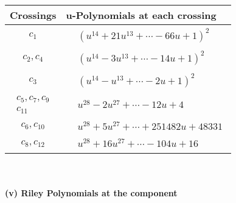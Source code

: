 \documentclass[1p]{elsarticle_modified}
\theoremstyle{definition}
\begin{document}
\begin{tabular}{m{50pt}|m{274pt}}
Crossings & \hspace{64pt}u-Polynomials at each crossing \\
\hline $$\begin{aligned}c_{1}\end{aligned}$$&$\begin{aligned}
&(u^{14}+21 u^{13}+\cdots-66 u+1)^{2}
\end{aligned}$\\
\hline $$\begin{aligned}c_{2},c_{4}\end{aligned}$$&$\begin{aligned}
&(u^{14}-3 u^{13}+\cdots-14 u+1)^{2}
\end{aligned}$\\
\hline $$\begin{aligned}c_{3}\end{aligned}$$&$\begin{aligned}
&(u^{14}- u^{13}+\cdots-2 u+1)^{2}
\end{aligned}$\\
\hline $$\begin{aligned}c_{5},c_{7},c_{9}\\c_{11}\end{aligned}$$&$\begin{aligned}
&u^{28}-2 u^{27}+\cdots-12 u+4
\end{aligned}$\\
\hline $$\begin{aligned}c_{6},c_{10}\end{aligned}$$&$\begin{aligned}
&u^{28}+5 u^{27}+\cdots+251482 u+48331
\end{aligned}$\\
\hline $$\begin{aligned}c_{8},c_{12}\end{aligned}$$&$\begin{aligned}
&u^{28}+16 u^{27}+\cdots-104 u+16
\end{aligned}$\\
\hline
\end{tabular}\\~\\
\newpage\renewcommand{\arraystretch}{1}
\flushleft \textbf{(v) Riley Polynomials at the component}\newline \\
\end{document}
